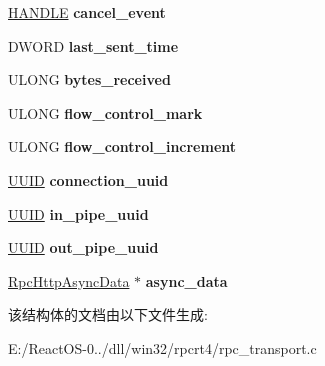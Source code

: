 \begin{DoxyCompactItemize}
\hyperlink{interfacevoid}{H\+A\+N\+D\+LE} {\bfseries cancel\+\_\+event}
\item 
\mbox{\label{struct___rpc_connection__http_ae294bd92c16a8bc8b2792d3b489412c3}} 
D\+W\+O\+RD {\bfseries last\+\_\+sent\+\_\+time}
\item 
\mbox{\label{struct___rpc_connection__http_a97e3c3c6e20241d8e8cd6e04619764c3}} 
U\+L\+O\+NG {\bfseries bytes\+\_\+received}
\item 
\mbox{\label{struct___rpc_connection__http_af1a3958881c3a176ef7cb6e3c2675179}} 
U\+L\+O\+NG {\bfseries flow\+\_\+control\+\_\+mark}
\item 
\mbox{\label{struct___rpc_connection__http_a8550f8da1d1b50b032310a624713007c}} 
U\+L\+O\+NG {\bfseries flow\+\_\+control\+\_\+increment}
\item 
\mbox{\label{struct___rpc_connection__http_a6e1829b76b54fca020af34d34bfbacec}} 
\hyperlink{interface_g_u_i_d}{U\+U\+ID} {\bfseries connection\+\_\+uuid}
\item 
\mbox{\label{struct___rpc_connection__http_ae9183a32f7c91106398e429bb3d5050b}} 
\hyperlink{interface_g_u_i_d}{U\+U\+ID} {\bfseries in\+\_\+pipe\+\_\+uuid}
\item 
\mbox{\label{struct___rpc_connection__http_abd7be1040899c9f29e2d05dc014e1e11}} 
\hyperlink{interface_g_u_i_d}{U\+U\+ID} {\bfseries out\+\_\+pipe\+\_\+uuid}
\item 
\mbox{\label{struct___rpc_connection__http_ab810ce0e3da00235e132d9b2f82e72a6}} 
\hyperlink{struct___rpc_http_async_data}{Rpc\+Http\+Async\+Data} $\ast$ {\bfseries async\+\_\+data}
\end{DoxyCompactItemize}


该结构体的文档由以下文件生成\+:\begin{DoxyCompactItemize}
\item 
E\+:/\+React\+O\+S-\/0../dll/win32/rpcrt4/rpc\+\_\+transport.\+c\end{DoxyCompactItemize}
